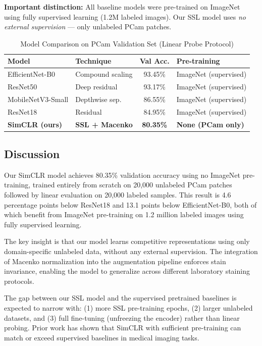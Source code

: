 \documentclass[conference]{IEEEtran}
\begin{document}
\textbf{Important distinction:} All baseline models were pre-trained on ImageNet using fully supervised learning (1.2M labeled images). Our SSL model uses \textit{no external supervision} — only unlabeled PCam patches.

\begin{table}[htbp]
\centering
\caption{Model Comparison on PCam Validation Set (Linear Probe Protocol)}
\label{tab:comparison}
\begin{tabular}{l l c l}
\toprule
\textbf{Model} & \textbf{Technique} & \textbf{Val Acc.} & \textbf{Pre-training} \\
\midrule
EfficientNet-B0 & Compound scaling & 93.45\% & ImageNet (supervised) \\
ResNet50 & Deep residual & 93.17\% & ImageNet (supervised) \\
MobileNetV3-Small & Depthwise sep. & 86.55\% & ImageNet (supervised) \\
ResNet18 & Residual & 84.95\% & ImageNet (supervised) \\
\midrule
\textbf{SimCLR (ours)} & \textbf{SSL + Macenko} & \textbf{80.35\%} & \textbf{None (PCam only)} \\
\bottomrule
\end{tabular}
\end{table}

\subsection{Discussion}
Our SimCLR model achieves 80.35\% validation accuracy using no ImageNet pre-training, trained entirely from scratch on 20,000 unlabeled PCam patches followed by linear evaluation on 20,000 labeled samples. This result is 4.6 percentage points below ResNet18 and 13.1 points below EfficientNet-B0, both of which benefit from ImageNet pre-training on 1.2 million labeled images using fully supervised learning.

The key insight is that our model learns competitive representations using only domain-specific unlabeled data, without any external supervision. The integration of Macenko normalization into the augmentation pipeline enforces stain invariance, enabling the model to generalize across different laboratory staining protocols.

The gap between our SSL model and the supervised pretrained baselines is expected to narrow with: (1) more SSL pre-training epochs, (2) larger unlabeled datasets, and (3) full fine-tuning (unfreezing the encoder) rather than linear probing. Prior work \cite{persis2025} has shown that SimCLR with sufficient pre-training can match or exceed supervised baselines in medical imaging tasks.
\end{document}
